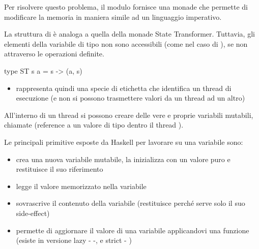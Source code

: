 Per risolvere questo problema, il modulo  fornisce una monade che permette di modificare la memoria in maniera simile ad un linguaggio imperativo.

La struttura di  è analoga a quella della monade State Transformer. Tuttavia, gli elementi della variabile di tipo  non sono accessibili (come nel caso di ), se non attraverso le operazioni definite.

\begin{haskellbox}{}
type ST s a = s -> (a, s)
\end{haskellbox}
\begin{itemize}
    \item {} rappresenta quindi una specie di etichetta che identifica un thread di esecuzione (e non si possono trasmettere valori da un thread ad un altro)
\end{itemize}

All'interno di un thread  si possono creare delle vere e proprie variabili mutabili, chiamate  (reference a un valore di tipo  dentro il thread ).

Le principali primitive esposte da Haskell per lavorare su una variabile  sono:
\begin{itemize}
    \item {}
        \subitem crea una nuova variabile mutabile, la inizializza con un valore puro e restituisce il suo riferimento
    \item {}
        \subitem legge il valore memorizzato nella variabile
    \item {}
        \subitem sovrascrive il contenuto della variabile (restituisce \code{()} perché serve solo il suo side-effect)
    \item {}
        \subitem permette di aggiornare il valore di una variabile applicandovi una funzione (esiste in versione lazy -  -, e strict - )
\end{itemize}


